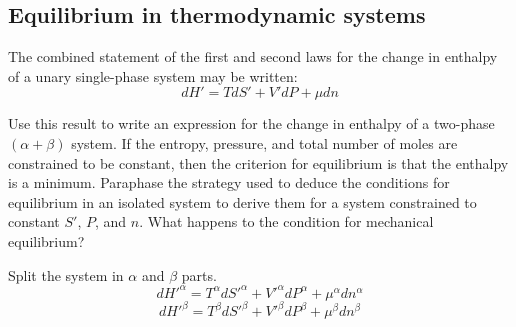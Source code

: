 \begin{@empty}
\section{Equilibrium in thermodynamic systems}
\begin{problem}
\end{problem}

\begin{problem}
\end{problem}

\begin{problem}
\end{problem}

\begin{problem}
\end{problem}

\begin{problem}
\end{problem}

\begin{problem}
\end{problem}

\begin{problem}
\end{problem}

\begin{problem}
\end{problem}

\begin{problem}
    The combined statement of the first and second laws for the change in
    enthalpy of a unary single-phase system may be written:
    \[ dH' = TdS' + V'dP + \mu dn \]

    Use this result to write an expression for the change in enthalpy of a
    two-phase $(\alpha + \beta)$ system.  If the entropy, pressure, and total
    number of moles are constrained to be constant, then the criterion for
    equilibrium is that the enthalpy is a minimum.  Paraphase the strategy used
    to deduce the conditions for equilibrium in an isolated system to derive
    them for a system constrained to constant $S'$, $P$, and $n$.  What happens
    to the condition for mechanical equilibrium?
\end{problem}

\begin{answer}
    Split the system in $\alpha$ and $\beta$ parts.
    \[ dH'^\alpha = T^\alpha dS'^\alpha + V'^\alpha dP^\alpha + \mu^\alpha dn^\alpha \]
    \[ dH'^\beta  = T^\beta  dS'^\beta  + V'^\beta  dP^\beta  + \mu^\beta  dn^\beta  \]


\end{answer}
\end{@empty}
